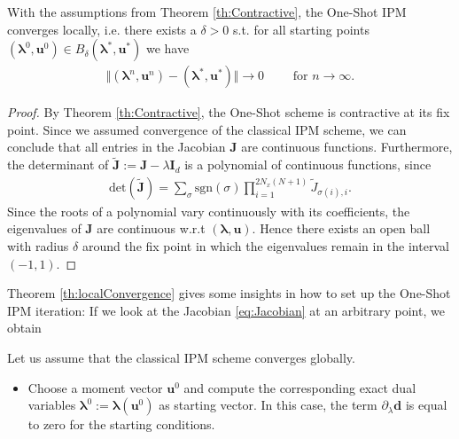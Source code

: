 \begin{theorem}\label{th:localConvergence}
With the assumptions from Theorem \ref{th:Contractive}, the One-Shot IPM converges locally, i.e. there exists a $\delta>0$ s.t. for all starting points $(\bm{\lambda}^0,\bm{u}^0)\in B_{\delta}(\bm{\lambda}^*,\bm{u}^*)$ we have
\begin{align*}
\Vert (\bm{\lambda}^n,\bm{u}^n) - (\bm{\lambda}^*,\bm{u}^*)\Vert \rightarrow 0 \qquad \text{ for } n \rightarrow \infty.
\end{align*}
\end{theorem}
\begin{proof}
By Theorem \ref{th:Contractive}, the One-Shot scheme is contractive at its fix point. Since we assumed convergence of the classical IPM scheme, we can conclude that all entries in the Jacobian $\bm{J}$ are continuous functions. Furthermore, the determinant of $\bm{\tilde{J}}:=\bm{J}-\lambda \bm{I}_d$ is a polynomial of continuous functions, since
\begin{align*}
\text{det}(\bm{\tilde J}) = \sum_{\sigma} \text{sgn}(\sigma)\prod_{i = 1}^{2 N_x (N+1)} \tilde J_{\sigma(i),i}.
\end{align*}
Since the roots of a polynomial vary continuously with its coefficients, the eigenvalues of $\bm{J}$ are continuous w.r.t $(\bm{\lambda},\bm{u})$. Hence there exists an open ball with radius $\delta$ around the fix point in which the eigenvalues remain in the interval $(-1,1)$.
\end{proof}
\begin{remark}
Theorem \ref{th:localConvergence} gives some insights in how to set up the One-Shot IPM iteration: If we look at the Jacobian \eqref{eq:Jacobian} at an arbitrary point, we obtain

Let us assume that the classical IPM scheme converges globally.

\begin{itemize}
\item Choose a moment vector $\bm{u}^0$ and compute the corresponding exact dual variables $\bm{\lambda}^0:=\bm{\lambda}(\bm{u}^0)$ as starting vector. In this case, the term $\partial_{\lambda}\bm{d}$ is equal to zero for the starting conditions.
\end{itemize}
\end{remark}